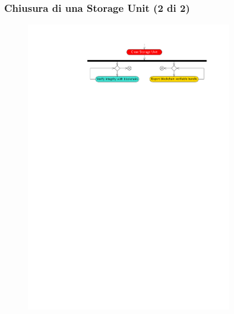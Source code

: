 \documentclass{beamer}
\begin{document}
\begin{frame}[fragile]
	\frametitle{Chiusura di una Storage Unit (2 di 2)}
	\begin{figure}
		\includegraphics[width=0.8\textwidth]{figures/closed.pdf}
	\end{figure}
	\begin{columns}
		\begin{figure}

\end{figure}
\end{columns}
\end{frame}
\end{document}
